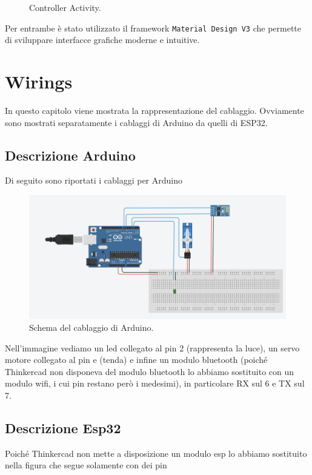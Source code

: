 \documentclass[a4paper,12pt]{report}
\begin{document}
\begin{itemize}
\begin{figure}[H]
        \caption{Controller Activity.}
        \label{fig:controller}
    \end{figure}
\end{itemize}
Per entrambe è stato utilizzato il framework \texttt{Material Design V3} che permette di sviluppare interfacce grafiche moderne e intuitive. 




\chapter{Wirings}
In questo capitolo viene mostrata la rappresentazione del cablaggio.
Ovviamente sono mostrati separatamente i cablaggi di Arduino da quelli di ESP32.
\section{Descrizione Arduino}
Di seguito sono riportati i cablaggi per Arduino

\begin{figure}[H]
\centering
\includegraphics[width=\textwidth]{img/wire-arduino.png}
\caption{Schema del cablaggio di Arduino.}
\label{fig:wiringsarduino}
\end{figure}

Nell'immagine vediamo un led collegato al pin 2 (rappresenta la luce), un servo motore collegato al pin e (tenda) e infine un modulo bluetooth (poiché Thinkercad non disponeva del modulo bluetooth lo abbiamo sostituito con un modulo wifi, i cui pin restano però i medesimi), in particolare RX sul 6 e TX sul 7.

\section{Descrizione Esp32}
Poiché Thinkercad non mette a disposizione un modulo esp lo abbiamo sostituito nella figura che segue solamente con dei pin
\end{document}
